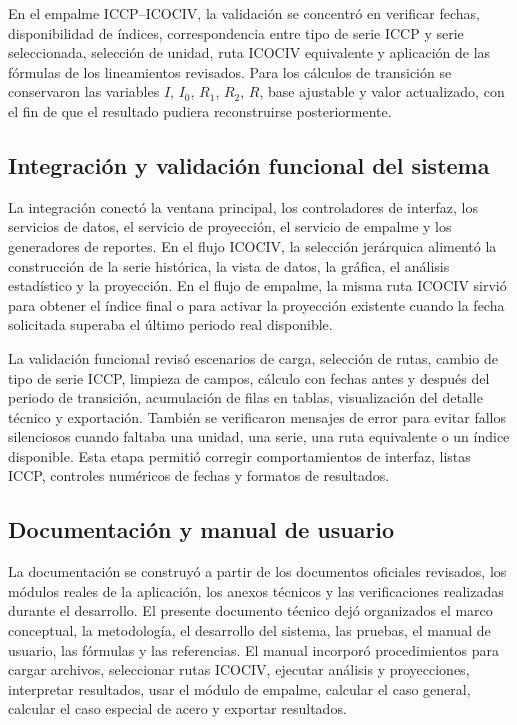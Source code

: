 \documentclass[12pt,letterpaper]{article}
\newcommand{\ICOCIV}{ICOCIV}
\newcommand{\ICCP}{ICCP}
\begin{document}
En el empalme \ICCP--\ICOCIV, la validación se concentró en verificar fechas, disponibilidad de índices, correspondencia entre tipo de serie \ICCP{} y serie seleccionada, selección de unidad, ruta \ICOCIV{} equivalente y aplicación de las fórmulas de los lineamientos revisados. Para los cálculos de transición se conservaron las variables \(I\), \(I_0\), \(R_1\), \(R_2\), \(R\), base ajustable y valor actualizado, con el fin de que el resultado pudiera reconstruirse posteriormente.

\subsection{Integración y validación funcional del sistema}

La integración conectó la ventana principal, los controladores de interfaz, los servicios de datos, el servicio de proyección, el servicio de empalme y los generadores de reportes. En el flujo \ICOCIV, la selección jerárquica alimentó la construcción de la serie histórica, la vista de datos, la gráfica, el análisis estadístico y la proyección. En el flujo de empalme, la misma ruta \ICOCIV{} sirvió para obtener el índice final o para activar la proyección existente cuando la fecha solicitada superaba el último periodo real disponible.

La validación funcional revisó escenarios de carga, selección de rutas, cambio de tipo de serie \ICCP, limpieza de campos, cálculo con fechas antes y después del periodo de transición, acumulación de filas en tablas, visualización del detalle técnico y exportación. También se verificaron mensajes de error para evitar fallos silenciosos cuando faltaba una unidad, una serie, una ruta equivalente o un índice disponible. Esta etapa permitió corregir comportamientos de interfaz, listas \ICCP, controles numéricos de fechas y formatos de resultados.

\subsection{Documentación y manual de usuario}

La documentación se construyó a partir de los documentos oficiales revisados, los módulos reales de la aplicación, los anexos técnicos y las verificaciones realizadas durante el desarrollo. El presente documento técnico dejó organizados el marco conceptual, la metodología, el desarrollo del sistema, las pruebas, el manual de usuario, las fórmulas y las referencias. El manual incorporó procedimientos para cargar archivos, seleccionar rutas \ICOCIV, ejecutar análisis y proyecciones, interpretar resultados, usar el módulo de empalme, calcular el caso general, calcular el caso especial de acero y exportar resultados.
\end{document}
